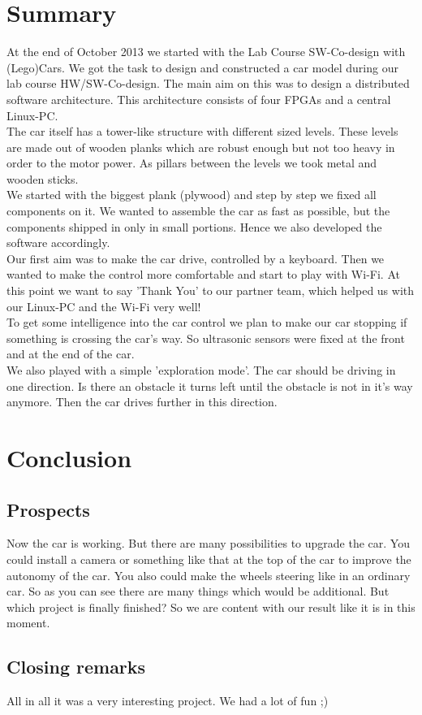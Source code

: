 

\section{Summary}
At the end of October 2013 we started with the Lab Course SW-Co-design with (Lego)Cars. We got the task to design and constructed a car model during our lab course HW/SW-Co-design. The main aim on this was to design a distributed software architecture. This architecture consists of four FPGAs and a central Linux-PC.\\

The car itself has a tower-like structure with different sized levels. These levels are made out of wooden planks which are robust enough but not too heavy in order to the motor power. As pillars between the levels we took metal and wooden sticks.\\
We started with the biggest plank (plywood) and step by step we fixed all components on it. We wanted to assemble the car as fast as possible, but the components shipped in only in small portions. Hence we also developed the software accordingly.\\

Our first aim was to make the car drive, controlled by a keyboard. Then we wanted to make the control more comfortable and start to play with Wi-Fi. At this point we want to say 'Thank You' to our partner team, which helped us with our Linux-PC and the Wi-Fi very well!\\

To get some intelligence into the car control we plan to make our car stopping if something is crossing the car's way. So ultrasonic sensors were fixed at the front and at the end of the car.\\

We also played with a simple 'exploration mode'. The car should be driving in one direction. Is there an obstacle it turns left until the obstacle is not in it's way anymore. Then the car drives further in this direction.


\newpage
\section{Conclusion}

\subsection{Prospects}
\begin{flushleft}
Now the car is working. But there are many possibilities to upgrade the car. You could install a camera or something like that at the top of the car to improve the autonomy of the car. You also could make the wheels steering like in an ordinary car. So as you can see there are many things which would be additional. But which project is finally finished? So we are content with our result like it is in this moment.
\end{flushleft}

\subsection{Closing remarks}
All in all it was a very interesting project. We had a lot of fun ;)